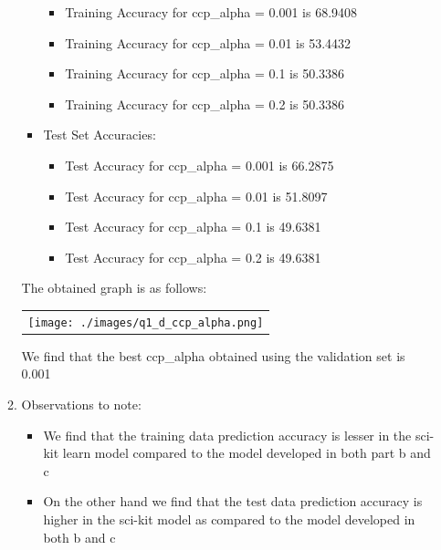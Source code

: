 \begin{enumerate}[label=(\alph*)]
\begin{enumerate}[label=\roman*.]
\begin{itemize}
                              \begin{itemize}
                                  \item Training Accuracy for ccp\_alpha = 0.001 is 68.9408
                                  \item Training Accuracy for ccp\_alpha = 0.01 is 53.4432
                                  \item Training Accuracy for ccp\_alpha = 0.1 is 50.3386
                                  \item Training Accuracy for ccp\_alpha = 0.2 is 50.3386
                              \end{itemize}
                        \item Test Set Accuracies:
                              \begin{itemize}
                                  \item Test Accuracy for ccp\_alpha = 0.001 is 66.2875
                                  \item Test Accuracy for ccp\_alpha = 0.01 is 51.8097
                                  \item Test Accuracy for ccp\_alpha = 0.1 is 49.6381
                                  \item Test Accuracy for ccp\_alpha = 0.2 is 49.6381
                              \end{itemize}
                    \end{itemize}
                    \newpage
                    The obtained graph is as follows:
                    \begin{center}
                        \begin{tabular}{c}
                            \texttt{[image: ./images/q1\_d\_ccp\_alpha.png]}
                        \end{tabular}
                    \end{center}
                    We find that the best ccp\_alpha obtained using the validation set is 0.001
              \item Observations to note:
                    \begin{itemize}
                        \item We find that the training data prediction accuracy is lesser in the sci-kit learn model compared to the model developed in both part b and c
                        \item On the other hand we find that the test data prediction accuracy is higher in the sci-kit model as compared to the model developed in both b and c
                    \end{itemize}
          \end{enumerate}


\end{enumerate}
